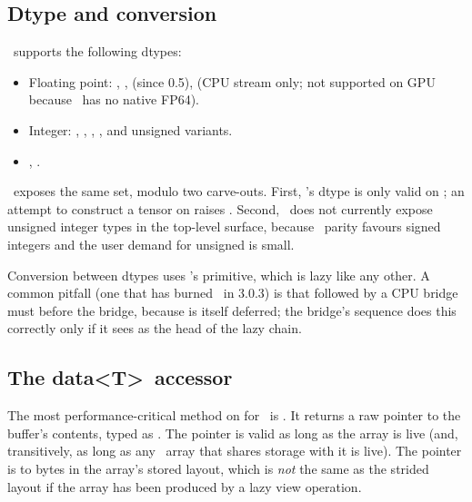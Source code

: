 \subsection{Dtype and conversion}
\label{ssec:mlx_runtime:array_dtype}

\MLX\ supports the following dtypes:

\begin{itemize}
  \item Floating point: , , 
    (since 0.5),  (CPU stream only; not supported on
    GPU because \Metal\ has no native FP64).
  \item Integer: , , ,
    , and unsigned variants.
  \item {}, .
\end{itemize}

\Lucid\ exposes the same set, modulo two carve-outs. First, \Lucid's
 dtype is only valid on ; an attempt
to construct a  tensor on  raises
. Second,
\Lucid\ does not currently expose unsigned integer types in the
top-level surface, because \ parity favours signed
integers and the user demand for unsigned is small.

Conversion between dtypes uses \MLX's  primitive, which
is lazy like any other. A common pitfall (one that has burned
\Lucid\ in 3.0.3) is that  followed by a CPU bridge
must  before the bridge, because  is itself
deferred; the bridge's  sequence does
this correctly only if it sees  as the head of the
lazy chain.

\subsection{The data\textless T\textgreater\ accessor}
\label{ssec:mlx_runtime:array_data}

The most performance-critical method on  for
\Lucid\ is . It returns a raw pointer to the
buffer's contents, typed as . The pointer is valid as long
as the array is live (and, transitively, as long as any \MLX\ array
that shares storage with it is live). The pointer is to bytes in
the array's stored layout, which is \emph{not} the same as the
strided layout if the array has been produced by a lazy view
operation.

